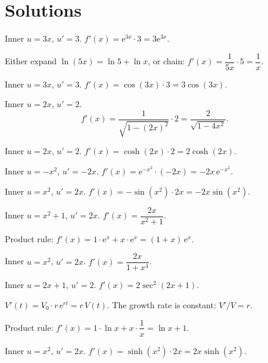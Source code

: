 \section{Solutions}

\begin{solutions}
  \item Inner $u=3x$, $u'=3$. $f'(x)=\mathrm{e}^{3x}\cdot 3=3\mathrm{e}^{3x}$.

  \item Either expand $\ln(5x)=\ln 5+\ln x$, or chain:
        $f'(x)=\dfrac{1}{5x}\cdot 5=\dfrac{1}{x}$.

  \item Inner $u=3x$, $u'=3$. $f'(x)=\cos(3x)\cdot 3=3\cos(3x)$.

  \item Inner $u=2x$, $u'=2$.
        \[
          f'(x)=\frac{1}{\sqrt{1-(2x)^{2}}}\cdot 2=\frac{2}{\sqrt{1-4x^{2}}} .
        \]

  \item Inner $u=2x$, $u'=2$. $f'(x)=\cosh(2x)\cdot 2=2\cosh(2x)$.

  \item Inner $u=-x^{2}$, $u'=-2x$.
        $f'(x)=\mathrm{e}^{-x^{2}}\cdot(-2x)=-2x\,\mathrm{e}^{-x^{2}}$.

  \item Inner $u=x^{2}$, $u'=2x$.
        $f'(x)=-\sin(x^{2})\cdot 2x=-2x\sin(x^{2})$.

  \item Inner $u=x^{2}+1$, $u'=2x$. $f'(x)=\dfrac{2x}{x^{2}+1}$.

  \item Product rule: $f'(x)=1\cdot\mathrm{e}^{x}+x\cdot\mathrm{e}^{x}
        =(1+x)\,\mathrm{e}^{x}$.

  \item Inner $u=x^{2}$, $u'=2x$. $f'(x)=\dfrac{2x}{1+x^{4}}$.

  \item Inner $u=2x+1$, $u'=2$. $f'(x)=2\sec^{2}(2x+1)$.

  \item $V'(t)=V_{0}\cdot r\,\mathrm{e}^{rt}=r\,V(t)$. The growth rate is
        constant: $V'/V=r$.

  \item Product rule: $f'(x)=1\cdot\ln x+x\cdot\dfrac{1}{x}=\ln x+1$.

  \item Inner $u=x^{2}$, $u'=2x$. $f'(x)=\sinh(x^{2})\cdot 2x
        =2x\sinh(x^{2})$.


\end{solutions}
